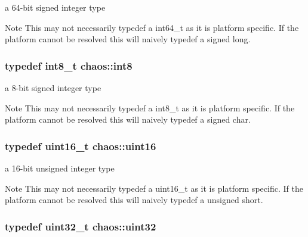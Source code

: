 a 64-\/bit signed integer type 

\begin{DoxyNote}{Note}
This may not necessarily {\ttfamily typedef} a {\ttfamily int64\+\_\+t} as it is platform specific. If the platform cannot be resolved this will naively {\ttfamily typedef} a {\ttfamily signed long}. 
\end{DoxyNote}
\hypertarget{namespacechaos_a56015674cfe4ad1fc583c3da6c724d8a}{}
\subsubsection[{int8}]{\setlength{\rightskip}{0pt plus 5cm}typedef int8\+\_\+t {\bf chaos\+::int8}}\label{namespacechaos_a56015674cfe4ad1fc583c3da6c724d8a}


a 8-\/bit signed integer type 

\begin{DoxyNote}{Note}
This may not necessarily {\ttfamily typedef} a {\ttfamily int8\+\_\+t} as it is platform specific. If the platform cannot be resolved this will naively {\ttfamily typedef} a {\ttfamily signed char}. 
\end{DoxyNote}
\hypertarget{namespacechaos_ac3888b1c9e56da7fbbdb3ab8425b4068}{}
\subsubsection[{uint16}]{\setlength{\rightskip}{0pt plus 5cm}typedef uint16\+\_\+t {\bf chaos\+::uint16}}\label{namespacechaos_ac3888b1c9e56da7fbbdb3ab8425b4068}


a 16-\/bit unsigned integer type 

\begin{DoxyNote}{Note}
This may not necessarily {\ttfamily typedef} a {\ttfamily uint16\+\_\+t} as it is platform specific. If the platform cannot be resolved this will naively {\ttfamily typedef} a {\ttfamily unsigned short}. 
\end{DoxyNote}
\hypertarget{namespacechaos_a3b3a47ba1e284655bf1a30c441121c60}{}
\subsubsection[{uint32}]{\setlength{\rightskip}{0pt plus 5cm}typedef uint32\+\_\+t {\bf chaos\+::uint32}}\label{namespacechaos_a3b3a47ba1e284655bf1a30c441121c60}


